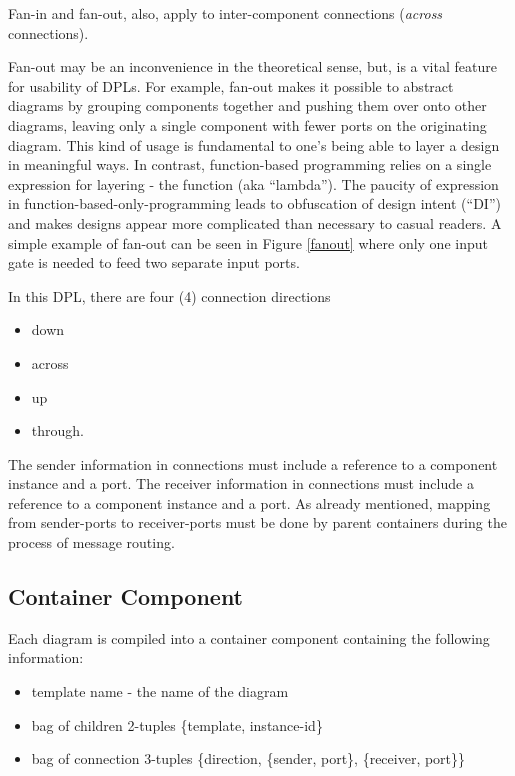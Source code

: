 \documentclass[10pt,anonymous,review]{acmart}
\begin{document}
Fan-in and fan-out, also, apply to inter-component connections (\emph{across} connections).

Fan-out may be an inconvenience in the theoretical sense, but, is a vital feature for usability of DPLs. For example, fan-out makes it possible to abstract diagrams by grouping components together and pushing them over onto other diagrams, leaving only a single component with fewer ports on the originating diagram. This kind of usage is fundamental to one’s being able to layer a design in meaningful ways. In contrast, function-based programming relies on a single expression for layering - the function (aka “lambda”). The paucity of expression in function-based-only-programming leads to obfuscation of design intent (“DI”) and makes designs appear more complicated than necessary to casual readers. A simple example of fan-out can be seen in Figure \ref{fanout} where only one input gate is needed to feed two separate input ports.




In this DPL, there are four (4) connection directions
\begin{itemize}
\item down
\item across
\item up
\item through.
\end{itemize}
The sender information in connections must include a reference to a component instance and a port.
The receiver information in connections must include a reference to a component instance and a port.
As already mentioned, mapping from sender-ports to receiver-ports must be done by parent containers during the process of message routing.
\subsection{Container Component}
Each diagram is compiled into a container component containing the following information:
\begin{itemize}
\item template name - the name of the diagram
\item bag of children 2-tuples \{template, instance-id\}
\item bag of connection 3-tuples \{direction, \{sender, port\}, \{receiver, port\}\}
\end{itemize}

\end{document}
